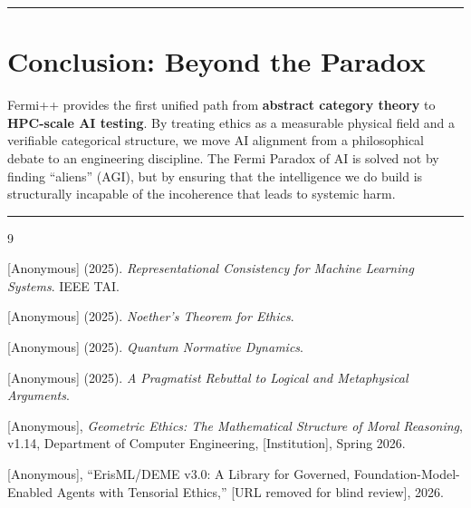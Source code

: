 \documentclass[12pt]{article}
\begin{document}
\bigskip
\hrule
\bigskip

\section{Conclusion: Beyond the Paradox}

Fermi++ provides the first unified path from \textbf{abstract category theory} to \textbf{HPC-scale AI testing}. By treating ethics as a measurable physical field and a verifiable categorical structure, we move AI alignment from a philosophical debate to an engineering discipline. The Fermi Paradox of AI is solved not by finding ``aliens'' (AGI), but by ensuring that the intelligence we do build is structurally incapable of the incoherence that leads to systemic harm.

\bigskip
\hrule
\bigskip

\begin{thebibliography}{9}

[Anonymous] (2025).
\textit{Representational Consistency for Machine Learning Systems}.
IEEE TAI.

[Anonymous] (2025).
\textit{Noether's Theorem for Ethics}.

[Anonymous] (2025).
\textit{Quantum Normative Dynamics}.

[Anonymous] (2025).
\textit{A Pragmatist Rebuttal to Logical and Metaphysical Arguments}.

[Anonymous], \emph{Geometric Ethics: The Mathematical Structure of Moral Reasoning}, v1.14, Department of Computer Engineering, [Institution], Spring 2026.

[Anonymous], ``ErisML/DEME v3.0: A Library for Governed, Foundation-Model-Enabled Agents with Tensorial Ethics,'' [URL removed for blind review], 2026.

\end{thebibliography}
\end{document}
